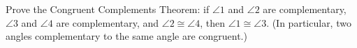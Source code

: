 Prove the Congruent Complements Theorem: if $\angle1$ and $\angle2$ are complementary, $\angle3$ and $\angle4$ are complementary, and $\angle2\cong\angle4$, then $\angle1\cong\angle3$. (In particular, two angles complementary to the same angle are congruent.)
